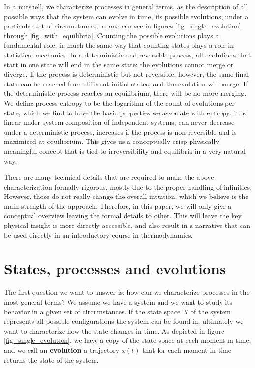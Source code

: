 \documentclass[letterpaper,twocolumn]{article}
\begin{document}
In a nutshell, we characterize processes in general terms, as the description of all possible ways that the system can evolve in time, its possible evolutions, under a particular set of circumstances, as one can see in figures \ref{fig_single_evolution} through \ref{fig_with_equilibria}. Counting the possible evolutions plays a fundamental role, in much the same way that counting states plays a role in statistical mechanics. In a deterministic and reversible process, all evolutions that start in one state will end in the same state: the evolutions cannot merge or diverge. If the process is deterministic but not reversible, however, the same final state can be reached from different initial states, and the evolution will merge. If the deterministic process reaches an equilibrium, there will be no more merging. We define process entropy to be the logarithm of the count of evolutions per state, which we find to have the basic properties we associate with entropy: it is linear under system composition of independent systems, can never decrease under a deterministic process, increases if the process is non-reversible and is maximized at equilibrium. This gives us a conceptually crisp physically meaningful concept that is tied to irreversibility and equilibria in a very natural way.

There are many technical details that are required to make the above characterization formally rigorous, mostly due to the proper handling of infinities. However, those do not really change the overall intuition, which we believe is the main strength of the approach. Therefore, in this paper, we will only give a conceptual overview leaving the formal details to other. This will leave the key physical insight is more directly accessible, and also result in a narrative that can be used directly in an introductory course in thermodynamics.

\section{States, processes and evolutions}

The first question we want to answer is: how can we characterize processes in the most general terms? We assume we have a system and we want to study its behavior in a given set of circumstances. If the state space $X$ of the system represents all possible configurations the system can be found in, ultimately we want to characterize how the state changes in time. As depicted in figure \ref{fig_single_evolution}, we have a copy of the state space at each moment in time, and we call an \textbf{evolution} a trajectory $x(t)$ that for each moment in time returns the state of the system. 
\end{document}
